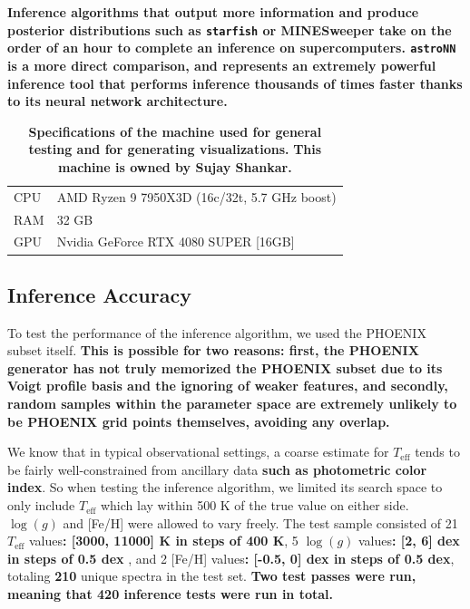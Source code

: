 \documentclass[twocolumn, linenumbers]{aastex631}
\begin{document}
\textbf{Inference algorithms that output more information and produce posterior distributions such as \texttt{starfish} \citep{starfish} or MINESweeper \citep{minesweeper} take on the order of an hour to complete an inference on supercomputers.
\texttt{astroNN} \citep{leung2019} is a more direct comparison, and represents an extremely powerful inference tool that performs inference thousands of times faster thanks to its neural network architecture.}
\begin{table}[h!]
    \centering
    \begin{tabular}{ll}
        \hline
        CPU & AMD Ryzen 9 7950X3D (16c/32t, 5.7 GHz boost)\\
        RAM & 32 GB\\
        GPU & Nvidia GeForce RTX 4080 SUPER [16GB]\\
        \hline
    \end{tabular}
    \caption{\textbf{Specifications of the machine used for general testing and for generating visualizations.}
    \textbf{This machine is owned by Sujay Shankar.}}
    \label{tab:table3}
\end{table}

\subsection{\textbf{Inference Accuracy}}
To test the performance of the inference algorithm, we used the PHOENIX subset itself.
\textbf{This is possible for two reasons: first, the PHOENIX generator has not truly memorized the PHOENIX subset due to its Voigt profile basis and the ignoring of weaker features, and secondly, random samples within the parameter space are extremely unlikely to be PHOENIX grid points themselves, avoiding any overlap.}

We know that in typical observational settings, a coarse estimate for $T_{\mathrm{eff}}$ tends to be fairly well-constrained from ancillary data \textbf{such as photometric color index}.
So when testing the inference algorithm, we limited its search space to only include $T_{\mathrm{eff}}$ which lay within 500 K of the true value on either side.
$\log(g)$ and [Fe/H] were allowed to vary freely.
The test sample consisted of 21 $T_{\mathrm{eff}}$ values\textbf{: [3000, 11000] K in steps of 400 K}, 5 $\log(g)$ values\textbf{: [2, 6] dex in steps of 0.5 dex} , and 2 [Fe/H] values\textbf{: [-0.5, 0] dex in steps of 0.5 dex}, totaling \textbf{210} unique spectra in the test set.
\textbf{Two test passes were run, meaning that 420 inference tests were run in total.}
\end{document}
